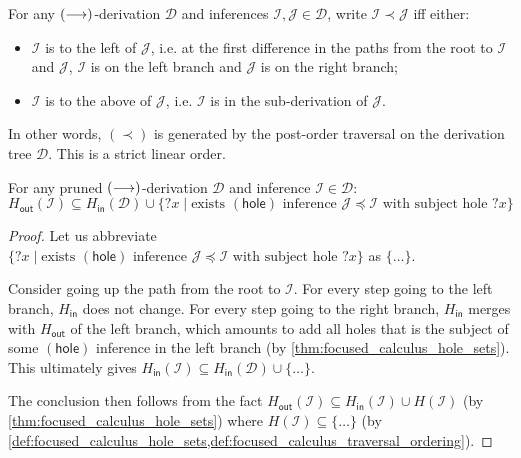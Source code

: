 \documentclass[twoside]{report}
\begin{document}
\begin{definition}
    \label{def:focused_calculus_traversal_ordering}
    For any $(\longrightarrow)$-derivation $\mathcal D$ and inferences $\mathcal I, \mathcal J \in \mathcal D$, write $\mathcal I \prec \mathcal J$ iff either:
    \begin{itemize}[noitemsep]
        \item $\mathcal I$ is to the left of $\mathcal J$, i.e. at the first difference in the paths from the root to $\mathcal I$ and $\mathcal J$, $\mathcal I$ is on the left branch and $\mathcal J$ is on the right branch;
        \item $\mathcal I$ is to the above of $\mathcal J$, i.e. $\mathcal I$ is in the sub-derivation of $\mathcal J$.
    \end{itemize}
    In other words, $(\prec)$ is generated by the post-order traversal on the derivation tree $\mathcal D$. This is a strict linear order.
\end{definition}

\begin{proposition}
    \label{thm:focused_calculus_traversal_ordering}
    For any pruned $(\longrightarrow)$-derivation $\mathcal D$ and inference $\mathcal I \in \mathcal D$:
    $$
        H_{\mathsf{out}}(\mathcal I) \subseteq H_{\mathsf{in}}(\mathcal D) \cup \{{?x} \mid \text{exists $(\mathsf{hole})$ inference $\mathcal J \preceq \mathcal I$ with subject hole } {?x}\}
    $$
\end{proposition}

\begin{proof}
    Let us abbreviate $\{{?x} \mid \text{exists $(\mathsf{hole})$ inference $\mathcal J \preceq \mathcal I$ with subject hole } {?x}\}$ as $\{\ldots\}$.

    Consider going up the path from the root to $\mathcal I$. For every step going to the left branch, $H_{\mathsf{in}}$ does not change. For every step going to the right branch, $H_{\mathsf{in}}$ merges with $H_{\mathsf{out}}$ of the left branch, which amounts to add all holes that is the subject of some $(\mathsf{hole})$ inference in the left branch (by \cref{thm:focused_calculus_hole_sets}). This ultimately gives $H_{\mathsf{in}}(\mathcal I) \subseteq H_{\mathsf{in}}(\mathcal D) \cup \{\ldots\}$.

    The conclusion then follows from the fact $H_{\mathsf{out}}(\mathcal I) \subseteq H_{\mathsf{in}}(\mathcal I) \cup H(\mathcal I)$ (by \cref{thm:focused_calculus_hole_sets}) where $H(\mathcal I) \subseteq \{\ldots\}$ (by \cref{def:focused_calculus_hole_sets,def:focused_calculus_traversal_ordering}).
\end{proof}
\end{document}
